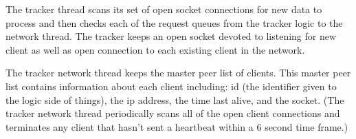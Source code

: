 
The tracker thread scans its set of open socket connections for new data to process and then checks each of the request queues from the tracker logic to the network thread. The tracker keeps an open socket devoted to listening for new client as well as open connection to each existing client in the network. 

The tracker network thread keeps the master peer list of clients. This master peer list contains information about each client including: id (the identifier given to the logic side of things), the ip address, the time last alive, and the socket. (The tracker network thread periodically scans all of the open client connections and terminates any client that hasn't sent a heartbeat within a 6 second time frame.)
